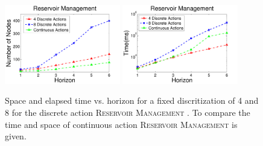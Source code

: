 \documentclass[twoside,11pt]{article}
\newcommand{\WaterReservoir}{\textsc{Reservoir Management }}
\begin{document}
\begin{figure}[tbp!]
\vspace{2mm}
\centering
\includegraphics[width=0.45\textwidth]{Figures2/camdp/DisResNode2.pdf}
\hspace{2mm}
\includegraphics[width=0.45\textwidth]{Figures2/camdp/DisResTime2.pdf}
\vspace{-2mm}
\caption{%
Space and elapsed time vs. horizon for a fixed discritization of 4 and 8 for the discrete action \WaterReservoir. To compare the time and space of continuous action \WaterReservoir is given. }
\label{fig:resDisTS}
\vspace{-5mm}
\end{figure}
\end{document}
